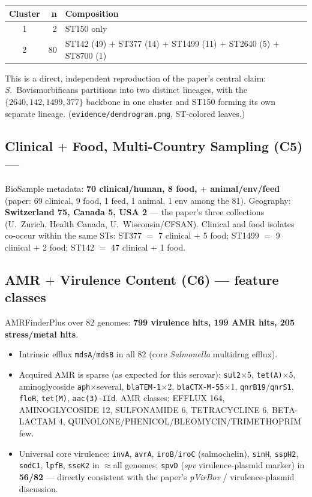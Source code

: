 \documentclass[11pt]{article}
\begin{document}
\begin{center}
\begin{tabular}{crl}
\toprule
Cluster & n & Composition \\
\midrule
1 & 2 & ST150 only \\
2 & 80 & ST142 (49) $+$ ST377 (14) $+$ ST1499 (11) $+$ ST2640 (5) $+$ ST8700 (1) \\
\bottomrule
\end{tabular}
\end{center}
This is a direct, independent reproduction of the paper's central claim: \emph{S.}\ Bovismorbificans partitions into two distinct lineages, with the $\{2640,142,1499,377\}$ backbone in one cluster and ST150 forming its own separate lineage. (\texttt{evidence/dendrogram.png}, ST-colored leaves.)

\subsection{Clinical $+$ Food, Multi-Country Sampling (C5) --- \checkmark}
BioSample metadata: \textbf{70 clinical/human, 8 food, $+$ animal/env/feed} (paper: 69 clinical, 9 food, 1 feed, 1 animal, 1 env among the 81). Geography: \textbf{Switzerland 75, Canada 5, USA 2} --- the paper's three collections (U.\ Zurich, Health Canada, U.\ Wisconsin/CFSAN). Clinical and food isolates co-occur within the same STs: ST377 $=$ 7 clinical $+$ 5 food; ST1499 $=$ 9 clinical $+$ 2 food; ST142 $=$ 47 clinical $+$ 1 food.

\subsection{AMR $+$ Virulence Content (C6) --- \checkmark feature classes}
AMRFinderPlus over 82 genomes: \textbf{799 virulence hits, 199 AMR hits, 205 stress/metal hits}.
\begin{itemize}
\item Intrinsic efflux \texttt{mdsA}/\texttt{mdsB} in all 82 (core \emph{Salmonella} multidrug efflux).
\item Acquired AMR is sparse (as expected for this serovar): \texttt{sul2}$\times$5, \texttt{tet(A)}$\times$5, aminoglycoside \texttt{aph}$\times$several, \texttt{blaTEM-1}$\times$2, \texttt{blaCTX-M-55}$\times$1, \texttt{qnrB19}/\texttt{qnrS1}, \texttt{floR}, \texttt{tet(M)}, \texttt{aac(3)-IId}. AMR classes: EFFLUX 164, AMINOGLYCOSIDE 12, SULFONAMIDE 6, TETRACYCLINE 6, BETA-LACTAM 4, QUINOLONE/PHENICOL/BLEOMYCIN/TRIMETHOPRIM few.
\item Universal core virulence: \texttt{invA}, \texttt{avrA}, \texttt{iroB}/\texttt{iroC} (salmochelin), \texttt{sinH}, \texttt{sspH2}, \texttt{sodC1}, \texttt{lpfB}, \texttt{sseK2} in $\approx$all genomes; \texttt{spvD} (\emph{spv} virulence-plasmid marker) in \textbf{56/82} --- directly consistent with the paper's \emph{pVirBov} / virulence-plasmid discussion.
\end{itemize}
\end{document}

